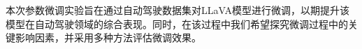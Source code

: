\documentclass[
    linespread = 1.25
]{ctexart}
\begin{document}
本次参数微调实验旨在通过自动驾驶数据集对LLaVA模型进行微调，以期提升该模型在自动驾驶领域的综合表现。同时，在该过程中我们希望探究微调过程中的关键影响因素，并采用多种方法评估微调效果。


\end{document}
